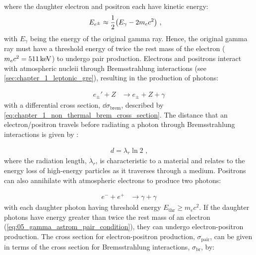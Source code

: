 \noindent where the daughter electron and positron each have kinetic energy:
\begin{equation}
    \begin{aligned}
    E_{e^\pm}&\approx \frac{1}{2}\qty(E_\gamma-2m_ec^2)\text{ ,}
    \end{aligned} \label{eq:05_gamma_astrom_pair_condition}
\end{equation}
\noindent with $E_\gamma$ being the energy of the original gamma ray. Hence, the original gamma ray must have a threshold energy of twice the rest mass of the electron ($m_ec^2=511\,\si{\kilo\electronvolt}$) to undergo pair production.
\newpar
Electrons and positrons interact with atmospheric nucleii through Bremsstrahlung interactions (see \autoref{sec:chapter_1_leptonic_gre}), resulting in the production of photons:

\begin{equation}
    \begin{aligned}
    e_\pm' + Z & \rightarrow e_{\pm} + Z + \gamma
    \end{aligned}
\end{equation}
\noindent with a differential cross section, $\dd{\sigma}_\text{brem}$, described by \autoref{eq:chapter_1_non_thermal_brem_cross_section}. The distance that an \mbox{electron/positron} travels before radiating a photon through Bremsstrahlung interactions is given by \citep{MATTHEWS2005387}:

\begin{equation}
    \begin{aligned}
    d=\lambda_r \ln 2\text{ ,}
    \end{aligned}
\end{equation}
\noindent where the radiation length, $\lambda_r$, is characteristic to a material and relates to the energy loss of high-energy particles as it traverses through a medium.
\newpar 
Positrons can also annihilate with atmospheric electrons to produce two photons:

\begin{equation}
    \begin{aligned}
    e^- + e^+&\rightarrow \gamma + \gamma
    \end{aligned}
\end{equation}
with each daughter photon having threshold energy $E_\text{thr}\geq m_ec^2$. If the daughter photons have energy greater than twice the rest mass of an electron (\autoref{eq:05_gamma_astrom_pair_condition}), they can undergo electron-positron production. The cross section for electron-positron production, $\sigma_\text{pair}$, can be given in terms of the cross section for Bremsstrahlung interactions, $\sigma_\text{br}$, by:

